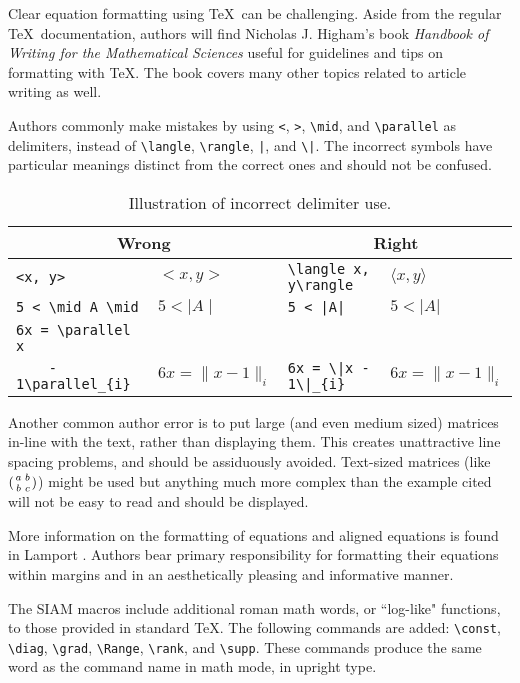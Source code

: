 \documentclass[final,leqno,onefignum,onetabnum]{siamltex1213}
\begin{document}
Clear equation formatting using \TeX\ can be challenging. Aside from
the regular \TeX\ documentation, authors will find Nicholas 
J. Higham's book {\em Handbook of Writing for the Mathematical
Sciences\/} \cite{Higham} useful for guidelines and tips on 
formatting with \TeX. The book covers many other topics related 
to article writing as well.                

Authors commonly make mistakes by using
 \verb|<|, \verb|>|, \verb|\mid|, and 
\verb|\parallel| as delimiters, instead of 
\verb|\langle|, \verb|\rangle|, \verb:|:,
and \verb:\|:. The incorrect symbols have particular 
meanings distinct from the correct ones and should not be confused.

\begin{table}[htbp]
\caption{Illustration of incorrect delimiter use.}
\begin{center}\footnotesize
\renewcommand{\arraystretch}{1.3}
\begin{tabular}{|ll|ll|}\hline
\multicolumn{2}{|c|}{{\bf Wrong}} & \multicolumn{2}{c|}{{\bf Right}}\\ \hline
\verb|<x, y>| & $<x, y>$   &  \verb|\langle x, y\rangle| & $\langle x, y\rangle$\\
\verb|5 < \mid A \mid| &  $5 < \mid A \mid$ & \verb:5 < |A|: &  $5 < |A|$\\
\verb|6x = \parallel x|&&&\\ 
\verb|    - 1\parallel_{i}| & $6x = \parallel x - 1\parallel_{i}$ &
   \verb:6x = \|x - 1\|_{i}: & $6x = \| x - 1\|_{i}$\\ \hline
\end{tabular}
\end{center}
\end{table}

Another common author error is to put large (and even medium sized)
matrices in-line with the text, rather than displaying them. This
creates unattractive line spacing problems, and should be assiduously
avoided. Text-sized matrices (like $({a \atop b} {b \atop c})$) might
be used but anything much more complex than the example cited will
not be easy to read and should be displayed.

More information on the formatting of equations and aligned
equations is found in Lamport \cite{Lamport}. Authors bear 
primary responsibility for formatting their equations within 
margins and in an aesthetically pleasing and informative manner.

The SIAM macros include additional roman math words, or ``log-like"
functions, to those provided in standard \TeX.  The following
commands are added: \verb:\const:, \verb:\diag:, \verb:\grad:,
\verb:\Range:, \verb:\rank:, and \verb:\supp:.
These commands produce the same word as the command name
in math mode, in upright type.
\end{document}
